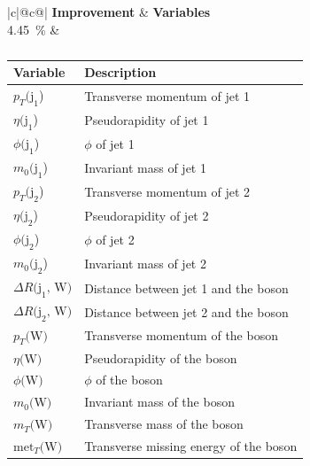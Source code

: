 \begin{table}[h]
    \centering
    \label{tab:app_vars_5}
    \caption{}
    \begin{tabular}{ |c|@{}c@{}| }
        \hline
        \textbf{Improvement} & \textbf{Variables}\\
        \hline
        \SI{4.45}{\%} & 
        \begin{tabular}{ll}
            \hline
            Variable & Description\\
            \hline
            $p_T\text{(j}_\text{1}$) & Transverse momentum of jet 1\\
            $\eta\text{(j}_\text{1}$) & Pseudorapidity of jet 1\\
            $\phi\text{(j}_\text{1}$) & $\phi$ of jet 1\\
            $m_0\text{(j}_\text{1}$) & Invariant mass of jet 1\\

            $p_T\text{(j}_\text{2}$) & Transverse momentum of jet 2\\
            $\eta\text{(j}_\text{2}$) & Pseudorapidity of jet 2\\
            $\phi\text{(j}_\text{2}$) & $\phi$ of jet 2\\
            $m_0\text{(j}_\text{2}$) & Invariant mass of jet 2\\

            $\Delta R\text{(j}_\text{1}\text{, W)}$ & Distance between jet 1 and the \PWplus boson\\
            $\Delta R\text{(j}_\text{2}\text{, W)}$ & Distance between jet 2 and the \PWplus boson\\

            $p_T\text{(W)}$ & Transverse momentum of the \PWplus boson\\
            $\eta\text{(W)}$ & Pseudorapidity of the \PWplus boson\\
            $\phi\text{(W)}$ & $\phi$ of the \PWplus boson\\
            $m_0\text{(W)}$ & Invariant mass of the \PWplus boson\\
            $m_T\text{(W)}$ & Transverse mass of the \PWplus boson\\
            $\text{met}_T\text{(W)}$ & Transverse missing energy of the \PWplus boson\\
            \hline
        \end{tabular}\\
        \hline
    \end{tabular}
\end{table}

